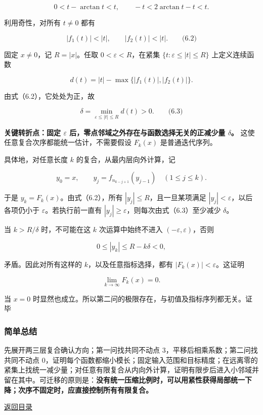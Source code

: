 \documentclass[11pt,a4paper]{article}
\begin{document}
\[
0<t-\arctan t<t,
\qquad
-t<2\arctan t-t<t.
\]

利用奇性，对所有 \(t\ne0\) 都有

\[
|f_1(t)|<|t|,\qquad |f_2(t)|<|t|.
\qquad\text{(6.2)}
\]

固定 \(x\ne0\)，记 \(R=|x|\)。任取 \(0<\varepsilon<R\)，在紧集
\(\{t:\varepsilon\le|t|\le R\}\) 上定义连续函数

\[
d(t)=|t|-\max\{|f_1(t)|,|f_2(t)|\}.
\]

由式（6.2），它处处为正，故

\[
\delta=\min_{\varepsilon\le|t|\le R}d(t)>0.
\qquad\text{(6.3)}
\]

\textbf{关键转折点：固定 \(\varepsilon\)
后，零点邻域之外存在与函数选择无关的正减少量 \(\delta\)。}
这使任意复合次序都能统一估计，不需要假设 \(F_k(x)\) 是普通迭代序列。

具体地，对任意长度 \(k\) 的复合，从最内层向外计算，记

\[
y_0=x,\qquad
y_j=f_{n_{k-j+1}}(y_{j-1})\quad(1\le j\le k).
\]

于是 \(y_k=F_k(x)\)。由式（6.2），所有 \(|y_j|\le R\)，且一旦某项满足
\(|y_j|<\varepsilon\)，以后各项仍小于 \(\varepsilon\)。若执行前一直有
\(|y_j|\ge\varepsilon\)，则每次由式（6.3）至少减少 \(\delta\)。

当 \(k>R/\delta\) 时，不可能在这 \(k\) 次运算中始终不进入
\((-\varepsilon,\varepsilon)\)，否则

\[
0\le |y_k|\le R-k\delta<0,
\]

矛盾。因此对所有这样的 \(k\)，以及任意指标选择，都有
\(|F_k(x)|<\varepsilon\)。这证明

\[
\boxed{\lim_{k\to\infty}F_k(x)=0}.
\]

当 \(x=0\)
时显然也成立。所以第二问的极限存在，与初值及指标序列都无关。证毕

\subsubsection{简单总结}\label{ux7b80ux5355ux603bux7ed3-21}

先展开两三层复合确认方向；第一问找共同不动点
\(3\)，平移后相乘系数；第二问找共同不动点
\(0\)，证明每个函数都缩小模长；固定输入范围和目标精度；在远离零的紧集上找统一减少量；对任意有限复合从内向外计算，证明有限步后进入小邻域并留在其中。可迁移的原则是：\textbf{没有统一压缩比例时，可以用紧性获得局部统一下降；次序不固定时，应直接控制所有有限复合。}

\noindent\hyperref[contents]{返回目录}

\clearpage
\end{document}
